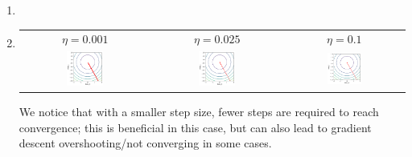 \documentclass[12pt]{article}
\begin{document}
\begin{enumerate}[label=(\alph*)]
    \item {}

    \item
    \begin{tabular}{c c c}
        $\eta = 0.001$ & $\eta = 0.025$ & $\eta = 0.1$ \\
        \includegraphics[width=0.3\textwidth]{../Q1/plots/e_contour_001.png} &
        \includegraphics[width=0.3\textwidth]{../Q1/plots/e_contour_025.png} &
        \includegraphics[width=0.3\textwidth]{../Q1/plots/e_contour_1.png} \\
    \end{tabular}

    We notice that with a smaller step size, fewer steps are required to reach convergence; this is beneficial in this case, but can also lead to gradient descent overshooting/not converging in some cases.

\end{enumerate}
\end{document}
